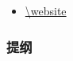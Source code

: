 \documentclass[8pt]{beamer}
\begin{document}
\begin{frame}
\titlepage
\begin{itemize}
\item   \footnotesize\url{\website}
\end{itemize}
\end{frame}

\begin{frame}[plain]
    \frametitle{提纲}
    \setcounter{tocdepth}{2}
    \tableofcontents
\end{frame}


\end{document}
